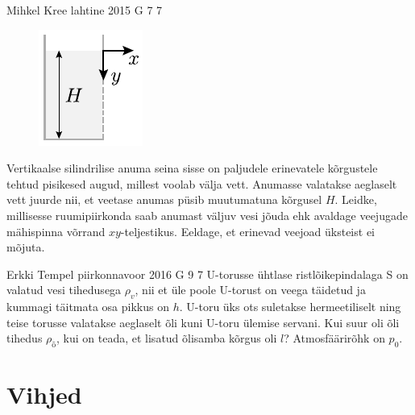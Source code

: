 \documentclass[11pt]{article}
\begin{document}
{%
{Mihkel Kree} %
{lahtine} %
{2015} %
{G 7} %
{7} %
{
\ifStatement
\begin{figure}%
\vspace{-15pt}
\includegraphics[width=\linewidth]{2015-lahg-07-veejoadJoon}%
\end{figure}
Vertikaalse silindrilise anuma seina sisse on paljudele erinevatele kõrgustele tehtud pisikesed augud, millest voolab välja vett. Anumasse valatakse aeglaselt vett juurde nii, et veetase anumas püsib muutumatuna kõrgusel $H$. Leidke, millisesse ruumipiirkonda saab anumast väljuv vesi jõuda ehk avaldage veejugade mähispinna võrrand $xy$-teljestikus. Eeldage, et erinevad veejoad üksteist ei mõjuta.
\fi
}

{Erkki Tempel} %
{piirkonnavoor} %
{2016} %
{G 9} %
{7} %
{
\ifStatement
U-torusse ühtlase ristlõikepindalaga S on valatud vesi tihedusega $\rho_v$, nii et üle poole U-torust on veega täidetud ja kummagi täitmata osa pikkus on $h$. U-toru üks ots suletakse hermeetiliselt ning teise torusse valatakse aeglaselt õli kuni U-toru ülemise servani. Kui suur oli õli tihedus $\rho_{\text{õ}}$, kui on teada, et lisatud õlisamba kõrgus oli $l$? Atmosfäärirõhk on $p_0$.
\fi
}
\newpage\normalsize\section{Vihjed}
        \ToggleHint
        
}
\end{document}
